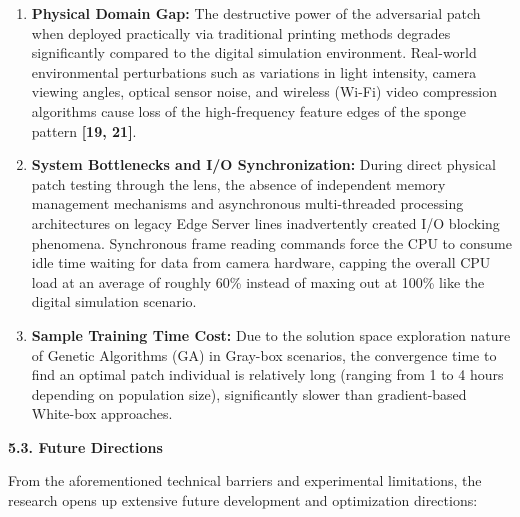 \documentclass[]{article}
\begin{document}
\begin{enumerate}
\def\labelenumi{\arabic{enumi}.}
\item
  \textbf{Physical Domain Gap:} The destructive power of the adversarial patch when deployed practically via traditional printing methods degrades significantly compared to the digital simulation environment. Real-world environmental perturbations such as variations in light intensity, camera viewing angles, optical sensor noise, and wireless (Wi-Fi) video compression algorithms cause loss of the high-frequency feature edges of the sponge pattern \textbf{{[}19, 21{]}}.
\item
  \textbf{System Bottlenecks and I/O Synchronization:} During direct physical patch testing through the lens, the absence of independent memory management mechanisms and asynchronous multi-threaded processing architectures on legacy Edge Server lines inadvertently created I/O blocking phenomena. Synchronous frame reading commands force the CPU to consume idle time waiting for data from camera hardware, capping the overall CPU load at an average of roughly 60\% instead of maxing out at 100\% like the digital simulation scenario.
\item
  \textbf{Sample Training Time Cost:} Due to the solution space exploration nature of Genetic Algorithms (GA) in Gray-box scenarios, the convergence time to find an optimal patch individual is relatively long (ranging from 1 to 4 hours depending on population size), significantly slower than gradient-based White-box approaches.
\end{enumerate}

\textbf{5.3. Future Directions}

From the aforementioned technical barriers and experimental limitations, the research opens up extensive future development and optimization directions:
\end{document}
